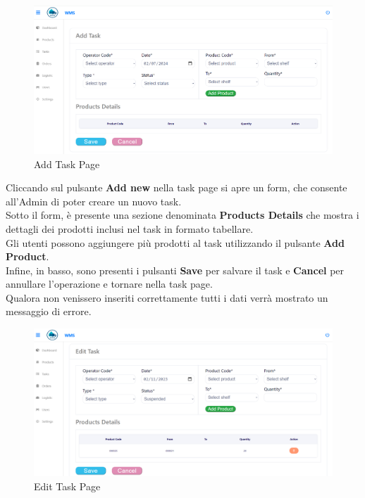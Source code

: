 \begin{figure}[H]
    \centering
    \includegraphics[width=\textwidth]{document/sections/img/Storyboard/addTaskPage.png}
    \caption{Add Task Page}
    \label{fig:addTaskPages}
\end{figure}

Cliccando sul pulsante \textbf{Add new} nella task page si apre un form, che consente
all'Admin di poter creare un nuovo task.\\
Sotto il form, è presente una sezione denominata \textbf{Products Details} che mostra i dettagli dei prodotti inclusi
nel task in formato tabellare.\\Gli utenti possono aggiungere più prodotti al task utilizzando il pulsante \textbf{Add Product}.\\
Infine, in basso, sono presenti i pulsanti \textbf{Save} per salvare il task e \textbf{Cancel} per annullare l'operazione
e tornare nella task page.\\
Qualora non venissero inseriti correttamente tutti i dati verrà mostrato un messaggio di errore.

\begin{figure}[H]
    \centering
    \includegraphics[width=\textwidth]{document/sections/img/Storyboard/editTaskPage.png}
    \caption{Edit Task Page}
    \label{fig:editTaskPage}
\end{figure}

